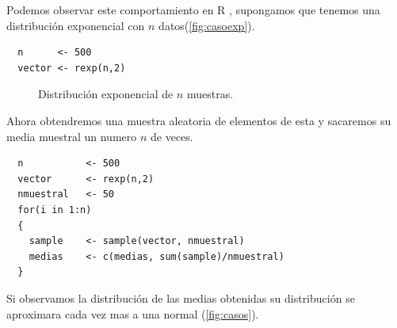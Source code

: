 \documentclass[]{article}
\begin{document}
Podemos observar este comportamiento en R \cite{rproject}, supongamos que tenemos una distribución exponencial con $n$ datos(\autoref{fig:casoexp}).
  \begin{lstlisting}
  n      <- 500
  vector <- rexp(n,2)
   \end{lstlisting}
\begin{figure}[hbt!]
%
\hfill
\caption{Distribución exponencial de $n$ muestras.}

\label{fig:casoexp}
\end{figure}
Ahora obtendremos una muestra aleatoria de elementos de esta y sacaremos su media muestral un numero $n$ de veces.
  \begin{lstlisting}
  n           <- 500
  vector      <- rexp(n,2)
  nmuestral   <- 50
  for(i in 1:n)
  {
    sample    <- sample(vector, nmuestral)
    medias    <- c(medias, sum(sample)/nmuestral)
  }
   \end{lstlisting}
Si observamos la distribución de las medias obtenidas su distribución se aproximara cada vez mas a una normal (\autoref{fig:casos}).
\end{document}
